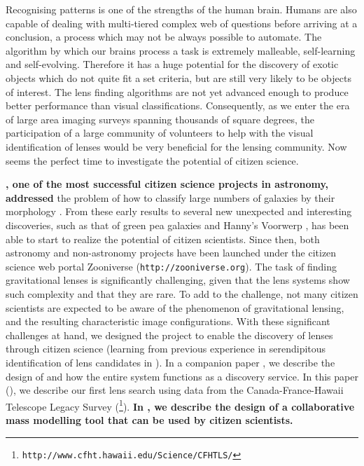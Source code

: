 \documentclass[useAMS,usenatbib,a4paper]{mn2e}
\begin{document}
Recognising patterns is one of the
strengths of the human brain. Humans are also capable of dealing with
multi-tiered complex web of questions before arriving at a conclusion, a process
which may
not be always possible to automate. The algorithm by which our brains process a
task is extremely malleable, self-learning and self-evolving. Therefore it has
a huge potential for the discovery of exotic objects which do not quite fit a
set criteria, but are still very likely to be objects of interest. The lens
finding algorithms are not yet advanced enough to produce better performance
than visual classifications. Consequently, as we enter the era of
large area imaging surveys spanning thousands of square degrees,
the participation of a large community of
volunteers to help with the visual identification of lenses would be very
beneficial for the lensing community.  Now seems
the perfect time to investigate the potential of citizen science.

{\bf \GZ, one of the most successful citizen science projects in
astronomy, addressed}
the problem of how to  classify large numbers of galaxies by their
morphology \citep{Lintott2008}.
From these early results to several new unexpected and
interesting discoveries, such as that of green pea galaxies
\citep{Cardamone2009,Jaskot2013} and Hanny's Voorwerp
\citep{Lintott2009,Keel2012}, \GZ has been able to start to realize the potential
of citizen scientists.  Since then, both astronomy and non-astronomy projects
have been launched under the citizen science web portal Zooniverse
(\texttt{http://zooniverse.org}). The task of finding gravitational lenses is
significantly challenging, given that the lens systems show such
complexity and that they are rare. To add to the challenge, not many
citizen scientists are expected to be aware of the phenomenon of
gravitational lensing, and the resulting characteristic image configurations.  With
these significant challenges at hand, we designed the \sw project to
enable the discovery of lenses through citizen science (learning from
previous experience in serendipitous identification of lens candidates in \GZ).
In a companion
paper \citep[][hereafter \PaperOne]{Marshall2015}, we describe the design of
\sw and how the entire system functions as a discovery service.  In this
paper (\PaperTwo), we describe our first lens search using data
from the Canada-France-Hawaii Telescope Legacy Survey
(\cfhtls\footnote{\texttt{http://www.cfht.hawaii.edu/Science/CFHTLS/}}).
{\bf In \citet{Kung2015}, we describe the design of a collaborative
mass modelling tool that can be used by citizen scientists.}
\end{document}
